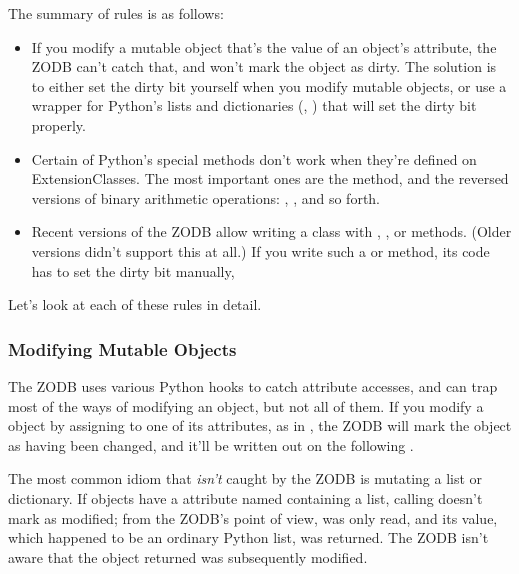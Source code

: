 The summary of rules is as follows:

\begin{itemize}
\item If you modify a mutable object that's the value of an object's
attribute, the ZODB can't catch that, and won't mark the object as
dirty.  
The solution is to either set the dirty bit yourself when you modify
mutable objects, or use a wrapper for Python's lists and dictionaries
(, 
)
that will set the dirty bit properly.

\item Certain of Python's special methods don't work when they're
defined on ExtensionClasses.  The most important ones are the
 method, and the reversed versions of binary
arithmetic operations: , , and so
forth.

\item Recent versions of the ZODB allow writing a class with 
 , , or  methods.  (Older versions didn't support this at all.)
If you write such a  or  method, 
its code has to set the dirty bit manually, 

\end{itemize}

Let's look at each of these rules in detail.

\subsubsection{Modifying Mutable Objects}

The ZODB uses various Python hooks to catch attribute accesses, and
can trap most of the ways of modifying an object, but not all of them.
If you modify a  object by assigning to one of its
attributes, as in , the ZODB will
mark the object as having been changed, and it'll be written out on
the following .

The most common idiom that \emph{isn't} caught by the ZODB is
mutating a list or dictionary.  If  objects have a
attribute named  containing a list, calling
 doesn't mark
 as modified; from the ZODB's point of
view,  was only read, and its value, which
happened to be an ordinary Python list, was returned.  The ZODB isn't
aware that the object returned was subsequently modified.

